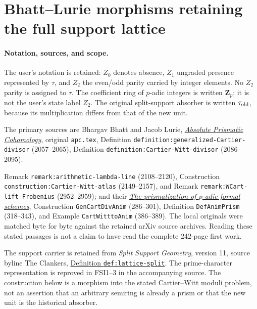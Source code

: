 \section{Bhatt--Lurie morphisms retaining the full support lattice}
\label{sec:BLM}

\paragraph{Notation, sources, and scope.}
The user's notation is retained: $Z_0$ denotes absence, $Z_1$
ungraded presence represented by $\tau$, and $Z_2$ the even/odd
parity carried by integer elements. No $Z_2$ parity is assigned
to $\tau$. The coefficient ring of $p$-adic integers is written
$\mathbf Z_p$; it is not the user's state label $Z_2$.
The original split-support absorber is written $\tau_{\rm old}$,
because its multiplication differs from that of the new unit.

\begingroup\raggedright
The primary sources are Bhargav Bhatt and Jacob Lurie,
\href{https://arxiv.org/abs/2201.06120v1}{\emph{Absolute Prismatic
Cohomology}}, original \nolinkurl{apc.tex}, Definition
\texttt{definition:\allowbreak{}generalized-\allowbreak{}Cartier-\allowbreak{}divisor} (2057--2065),
Definition \texttt{definition:\allowbreak{}Cartier-\allowbreak{}Witt-\allowbreak{}divisor}
(2086--2095).\par
Remark \texttt{remark:\allowbreak{}arithmetic-\allowbreak{}lambda-\allowbreak{}line} (2108--2120),
Construction \texttt{construction:\allowbreak{}Cartier-\allowbreak{}Witt-\allowbreak{}atlas} (2149--2157),
and Remark \texttt{remark:\allowbreak{}WCart-\allowbreak{}lift-\allowbreak{}Frobenius} (2952--2959);
and their
\href{https://arxiv.org/abs/2201.06124v1}{\emph{The prismatization
of $p$-adic formal schemes}}, Construction
\texttt{GenCartDivAnim} (286--301), Definition
\texttt{DefAnimPrism} (318--343), and Example
\texttt{CartWitttoAnim} (386--389).
The local originals were matched byte for byte against the retained
arXiv source archives. Reading these stated passages is not a claim
to have read the complete 242-page first work.\par\endgroup

The support carrier is retained from \emph{Split Support Geometry},
version 11, source byline The Clankers,
\href{https://github.com/KokunoYumeto/zeta-function-research-reader/blob/a2851f9eb352e7e4376bc629de86fa4ed9c1c434/workbenches/splitzero-tandem/foundations/split-support-geometry-v11/split_support_geometry_arithmetic_curve_v11.tex#L1226}
{Definition \texttt{def:lattice-split}}. The prime-character
representation is reproved in FSI1--3 in the accompanying source.
The construction below is a morphism into the stated Cartier--Witt
moduli problem, not an assertion that an arbitrary semiring is
already a prism or that the new unit is the historical absorber.

